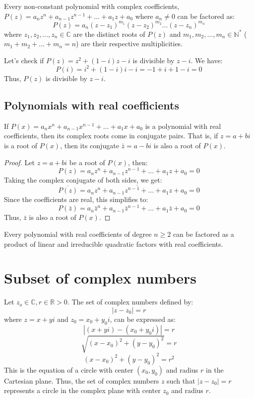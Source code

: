 \begin{theorem}
    Every non-constant polynomial with complex coefficients, $P(z) = a_n z^n + a_{n-1} z^{n-1} + \ldots + a_1 z + a_0$ where $a_n \neq 0$ can be factored as:
    \[
        P(z) = a_n (z - z_1)^{m_1}(z - z_2)^{m_2} \ldots (z - z_n)^{m_n}
    \]
    where $z_1, z_2, \ldots, z_n \in \mathbb{C}$ are the distinct roots of $P(z)$ and $m_1, m_2, \ldots, m_n \in \mathbb{N}^*$ ($m_1 + m_2 + \ldots + m_n = n$) are their respective multiplicities.
\end{theorem}

\begin{eg}
    Let's check if $P(z) = z^2 + (1-i)z - i$ is divisible by $z - i$. We have:
    \[        P(i) = i^2 + (1-i)i - i = -1 + i + 1 - i = 0
    \]
    Thus, $P(z)$ is divisible by $z - i$.
\end{eg}

\subsection{Polynomials with real coefficients}
If $P(x) = a_n x^n + a_{n-1} x^{n-1} + \ldots + a_1 x + a_0$ is a polynomial with real coefficients, then its complex roots come in conjugate pairs. That is, if $z = a + bi$ is a root of $P(x)$, then its conjugate $\bar{z} = a - bi$ is also a root of $P(x)$.
\begin{proof}
    Let $z = a + bi$ be a root of $P(x)$, then:
    \[        P(z) = a_n z^n + a_{n-1} z^{n-1} + \ldots + a_1 z + a_0 = 0
    \]
    Taking the complex conjugate of both sides, we get:
    \[        \overline{P(z)} = \overline{a_n z^n + a_{n-1} z^{n-1} + \ldots + a_1 z + a_0} = 0
    \]
    Since the coefficients are real, this simplifies to:
    \[        P(\bar{z}) = a_n \bar{z}^n + a_{n-1} \bar{z}^{n-1} + \ldots + a_1 \bar{z} + a_0 = 0
    \]
    Thus, $\bar{z}$ is also a root of $P(x)$.
\end{proof}
Every polynomial with real coefficients of degree $n \geq 2$ can be factored as a product of linear and irreducible quadratic factors with real coefficients.

\section{Subset of complex numbers}
\begin{eg}
    Let $z_o \in \mathbb{C}, r \in \mathbb{R} > 0$. The set of complex numbers defined by:
    \[        |z - z_0| = r
    \]
    where $z = x + yi$ and $z_0 = x_0 + y_0 i$, can be expressed as:
    \[        |(x + yi) - (x_0 + y_0 i)| = r
    \]
    \[        \sqrt{(x - x_0)^2 + (y - y_0)^2} = r
    \]
    \[        (x - x_0)^2 + (y - y_0)^2 = r^2
    \]
    This is the equation of a circle with center $(x_0, y_0)$ and radius $r$ in the Cartesian plane. Thus, the set of complex numbers $z$ such that $|z - z_0| = r$ represents a circle in the complex plane with center $z_0$ and radius $r$.
\end{eg}

